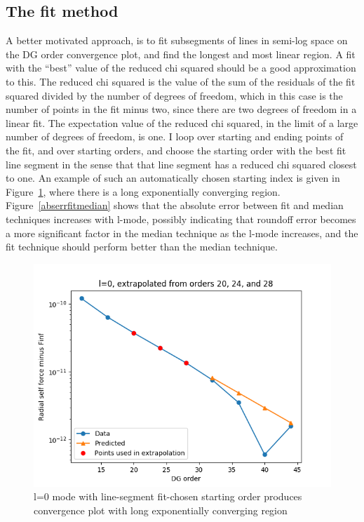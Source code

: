 \subsection{The fit method}
A better motivated approach, is to fit subsegments of lines in semi-log space on the DG order convergence plot, and find the longest and most linear region. A fit with the ``best'' value of the reduced chi squared should be a good approximation to this. The reduced chi squared is the value of the sum of the residuals of the fit squared divided by the number of degrees of freedom, which in this case is the number of points in the fit minus two, since there are two degrees of freedom in a linear fit. The expectation value of the reduced chi squared, in the limit of a large number of degrees of freedom, is one. I loop over starting and ending points of the fit, and over starting orders, and choose the starting order with the best fit line segment in the sense that that line segment has a reduced chi squared closest to one. An example of such an automatically chosen starting index is given in Figure~\ref{autoconverge}, where there is a long exponentially converging region. Figure~\ref{abserrfitmedian} shows that the absolute error between fit and median techniques increases with l-mode, possibly indicating that roundoff error becomes a more significant factor in the median technique as the l-mode increases, and the fit technique should perform better than the median technique. 

\begin{figure}
  \includegraphics{fittingtechniqet370l0}
  \caption{l=0 mode with line-segment fit-chosen starting order produces convergence plot with long exponentially converging region}
  \label{autoconverge}
\end{figure}

